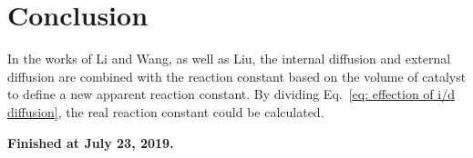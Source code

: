 \section{Conclusion}
In the works of Li and Wang, as well as Liu, the internal diffusion and external diffusion are combined with the reaction constant based on the volume of catalyst to define a new apparent reaction constant. 
By dividing Eq.~\eqref{eq: effection of i/d diffusion}, the real reaction constant could be calculated.

\textbf{Finished at July 23, 2019. }

%
